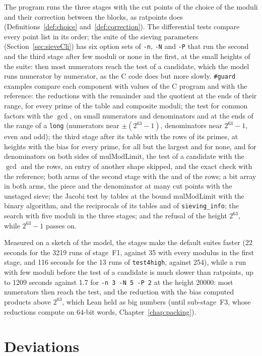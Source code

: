 The program runs the three stages with the cut points of the choice of the moduli and their
correction between the blocks, as ratpoints does (Definitions~\ref{def:choice}
and~\ref{def:correction}). The differential tests compare every point list in its order; the suite
of the sieving parameters (Section~\ref{sec:sieveCli}) has six option sets of \verb|-n|, \verb|-N|
and \verb|-P| that run the second and the third stage after few moduli or none in the first, at the
small heights of the suite: then most numerators reach the test of a candidate, which the model runs
numerator by numerator, as the C code does but more slowly. \verb|#guard| examples compare each
component with values of the C program and with the reference: the reductions with the remainder and
the quotient at the ends of their range, for every prime of the table and composite moduli; the test
for common factors with the $\gcd$, on small numerators and denominators and at the ends of the
range of a \verb|long| (numerators near $\pm(2^{63} - 1)$, denominators near $2^{63} - 1$, even and
odd); the third stage after its table with the rows of its primes, at heights with the bias for
every prime, for all but the largest and for none, and for denominators on both sides of
$\mathrm{mulModLimit}$, the test of a candidate with the $\gcd$ and the rows, an entry of another
shape skipped, and the exact check with the reference; both arms of the second stage with the and of
the rows; a bit array in both arms, the piece and the denominator at many cut points with the
unstaged sieve; the Jacobi test by tables at the bound $\mathrm{mulModLimit}$ with the binary
algorithm, and the reciprocals of its tables and of \verb|sieving_info|; the search with five moduli
in the three stages; and the refusal of the height $2^{63}$, while $2^{63} - 1$ passes on.

Measured on a sketch of the model, the stages make the default suites faster (22 seconds for the
3219 runs of stage~F1, against 35 with every modulus in the first stage, and 116 seconds for the 13
runs of \verb|test4high|, against 254), while a run with few moduli before the test of a candidate
is much slower than ratpoints, up to 1209 seconds against 1.7 for \verb|-n 3 -N 5 -P 2| at the
height 20000: most numerators then reach the test, and the reduction with the bias computed products
above $2^{63}$, which Lean held as big numbers (until sub-stage~F3, whose reductions compute on
$64$-bit words, Chapter~\ref{chap:packing}).

\section{Deviations}\label{sec:stagesDeviations}

